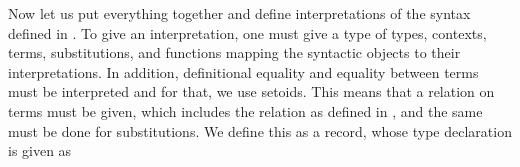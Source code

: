 
Now let us put everything together and define interpretations of the syntax defined in .
To give an interpretation, one must give a type of types, contexts, terms, substitutions, and functions mapping the syntactic objects to their interpretations.
In addition, definitional equality and equality between terms must be interpreted and for that, we use setoids.
This means that a relation on terms must be given, which includes the relation  as defined in , and the same must be done for substitutions.
We define this as a record, whose type declaration is given as

\begin{code}%
\>[0]\AgdaSpace{}%
\AgdaSpace{}%
\AgdaSymbol{\{}\AgdaSpace{}%
\AgdaSymbol{\}}\AgdaSpace{}%
\AgdaSymbol{:}\AgdaSpace{}%
\AgdaSpace{}%
\AgdaSymbol{(}\AgdaSpace{}%
\AgdaSymbol{(}\AgdaSpace{}%
\AgdaSpace{}%
\AgdaSymbol{))}\AgdaSpace{}%
\<%
\end{code}

